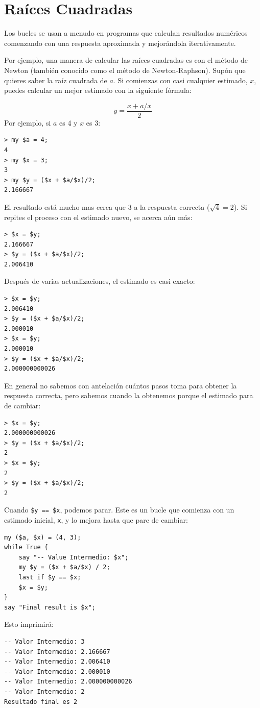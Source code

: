 \section{Raíces Cuadradas}
\label{squareroot}

Los bucles se usan a menudo en programas que calculan
resultados numéricos comenzando con una respuesta 
aproximada y mejorándola iterativamente.


Por ejemplo, una manera de calcular las raíces cuadradas
es con el método de Newton (también conocido como el método de
Newton-Raphson). Supón que quieres saber la raíz cuadrada de $a$. 
Si comienzas con casi cualquier estimado, $x$, puedes calcular un mejor
estimado con la siguiente fórmula:

\[ y = \frac{x + a/x}{2} \]
%
Por ejemplo, si $a$ es 4 y $x$ es 3:

\begin{lstlisting}
> my $a = 4;
4
> my $x = 3;
3
> my $y = ($x + $a/$x)/2;
2.166667
\end{lstlisting}
%
El resultado está mucho mas cerca que 3 a la respuesta correcta ($\sqrt{4} = 2$).
Si repites el proceso con el estimado nuevo, se acerca aún más:

\begin{lstlisting}
> $x = $y;
2.166667
> $y = ($x + $a/$x)/2;
2.006410
\end{lstlisting}
%
Después de varias actualizaciones, el estimado es casi exacto:

\begin{lstlisting}
> $x = $y;
2.006410
> $y = ($x + $a/$x)/2;
2.000010
> $x = $y;
2.000010
> $y = ($x + $a/$x)/2;
2.000000000026
\end{lstlisting}
%
En general no sabemos con antelación cuántos pasos toma
para obtener la respuesta correcta, pero sabemos cuando la 
obtenemos porque el estimado para de cambiar:

\begin{lstlisting}
> $x = $y;
2.000000000026
> $y = ($x + $a/$x)/2;
2
> $x = $y;
2
> $y = ($x + $a/$x)/2;
2
\end{lstlisting}
%
Cuando {\tt \$y == \$x}, podemos parar. Este es un bucle que comienza
con un estimado inicial, {\tt x}, y lo mejora hasta que pare de cambiar:

\begin{lstlisting}
my ($a, $x) = (4, 3);
while True {
    say "-- Value Intermedio: $x";
    my $y = ($x + $a/$x) / 2;
    last if $y == $x;
    $x = $y;
}
say "Final result is $x";
\end{lstlisting}
%
Esto imprimirá:
\begin{lstlisting}
-- Valor Intermedio: 3
-- Valor Intermedio: 2.166667
-- Valor Intermedio: 2.006410
-- Valor Intermedio: 2.000010
-- Valor Intermedio: 2.000000000026
-- Valor Intermedio: 2
Resultado final es 2
\end{lstlisting}
%

